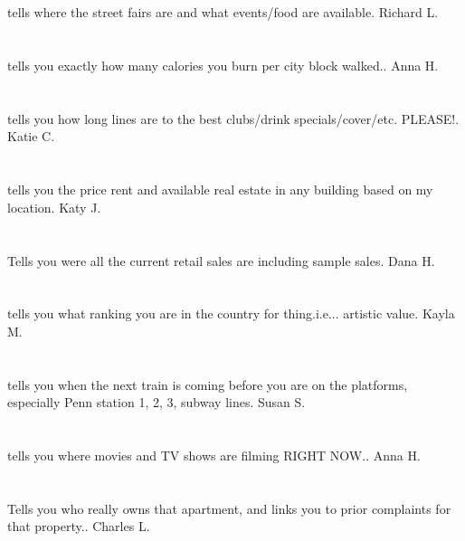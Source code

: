 \section{}tells where the street fairs are and what events/food are available. Richard L.
\section{}tells you exactly how many calories you burn per city block walked.. Anna H.
\section{} tells you how long lines are to the best clubs/drink specials/cover/etc. PLEASE!. Katie C.
\section{}tells you the price rent and available real estate in any building based on my location. Katy J.
\section{}Tells you were all the current retail sales are including sample sales. Dana H.
\section{}tells you what ranking you are in the country for thing.i.e... artistic value. Kayla M.
\section{}tells you when the next train is coming before you are on the platforms,  especially Penn station 1, 2, 3, subway lines. Susan S.
\section{}tells you where movies and TV shows are filming RIGHT NOW.. Anna H.
\section{}Tells you who really owns that apartment,  and links you to prior complaints for that property.. Charles L.
